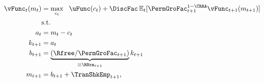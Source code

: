   \begin{equation}\begin{gathered}\begin{aligned}
        \vFunc_{\prd}(m_{\prd}) & = \max_{{c}_{\prd}} ~~ \uFunc(c_{\prd})+{\DiscFac}\Ex_{\prd}[ \PermGroFac_{\prd+1}^{1-\CRRA}\vFunc_{\prd+1}(m_{\prd+1})] \label{eq:vNormed}                   \\
                                         & \text{s.t.}                                                                                 \\
        a_{\prd}                       & = m_{\prd}-c_{\prd}                                                                     \\
        k_{\prd+1}                     & = a_{\prd}                                                                                \\
        b_{\prd+1}                     & = \underbrace{\left(\Rfree/\PermGroFac_{\prd+1}\right)}_{\equiv \RNrm_{\prd+1}}k_{\prd+1} \\
        m_{t+1}                        & = b_{t+1}+\TranShkEmp_{t+1},
      \end{aligned}\end{gathered}\end{equation}
